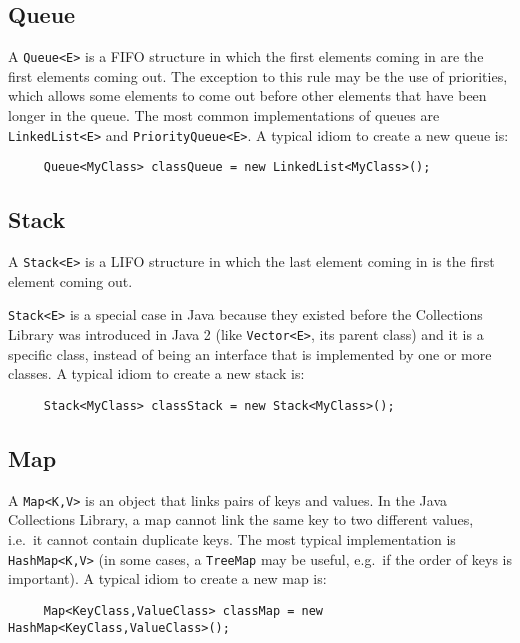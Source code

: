 \subsection{Queue}
\label{sec:queue}

A \verb+Queue<E>+ is a FIFO structure in which the first elements coming
in are the first elements coming out. The exception to this rule may
be the use of priorities, which allows some elements to come out
before other elements that have been longer in the queue. The most
common implementations of queues are \verb+LinkedList<E>+ and
\verb+PriorityQueue<E>+. A typical idiom to
create a new queue is:

\begin{verbatim}
     Queue<MyClass> classQueue = new LinkedList<MyClass>();
\end{verbatim}

\subsection{Stack}
\label{sec:stack}

A \verb+Stack<E>+ is a LIFO structure in which the last element coming in
is the first element coming out. 

\verb+Stack<E>+ is a special case in Java because they existed before the
Collections Library was introduced in Java 2 (like \verb+Vector<E>+, its
parent class) and it is a specific class, instead of being an
interface that is implemented by one or more classes. A typical idiom to
create a new stack is:

\begin{verbatim}
     Stack<MyClass> classStack = new Stack<MyClass>();
\end{verbatim}

\subsection{Map}
\label{sec:maps}

A \verb+Map<K,V>+ is an object that links pairs of keys and values. In
the Java Collections Library, a map cannot link the same key to two
different values, i.e.~it cannot contain duplicate keys. The most
typical implementation is \verb+HashMap<K,V>+ (in some cases, a
\verb+TreeMap+ may be useful, e.g.~if the order of keys is
important). A typical idiom to
create a new map is:

\begin{verbatim}
     Map<KeyClass,ValueClass> classMap = new HashMap<KeyClass,ValueClass>();
\end{verbatim}



